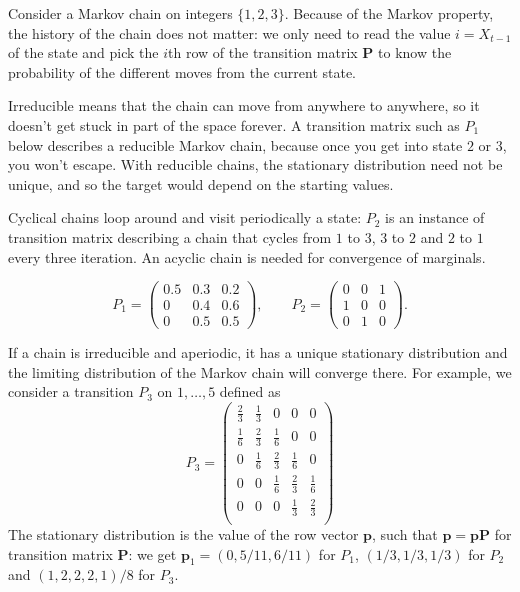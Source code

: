 \documentclass[
  11pt,
  letterpaper,
]{scrbook}
\theoremstyle{definition}
\theoremstyle{definition}
\theoremstyle{definition}
\theoremstyle{plain}
\theoremstyle{plain}
\theoremstyle{remark}
\begin{document}
Consider a Markov chain on integers \(\{1, 2, 3\}\). Because of the
Markov property, the history of the chain does not matter: we only need
to read the value \(i=X_{t-1}\) of the state and pick the \(i\)th row of
the transition matrix \(\mathbf{P}\) to know the probability of the
different moves from the current state.

Irreducible means that the chain can move from anywhere to anywhere, so
it doesn't get stuck in part of the space forever. A transition matrix
such as \(P_1\) below describes a reducible Markov chain, because once
you get into state \(2\) or \(3\), you won't escape. With reducible
chains, the stationary distribution need not be unique, and so the
target would depend on the starting values.

Cyclical chains loop around and visit periodically a state: \(P_2\) is
an instance of transition matrix describing a chain that cycles from
\(1\) to \(3\), \(3\) to \(2\) and \(2\) to \(1\) every three iteration.
An acyclic chain is needed for convergence of marginals.

\[
P_1 = \begin{pmatrix}
0.5 & 0.3 & 0.2 \\
0 & 0.4 & 0.6 \\
0 & 0.5 & 0.5
\end{pmatrix},
\qquad
P_2 = \begin{pmatrix}
0 & 0 & 1 \\
1 & 0 & 0 \\
0 & 1 & 0
\end{pmatrix}.
\]

If a chain is irreducible and aperiodic, it has a unique stationary
distribution and the limiting distribution of the Markov chain will
converge there. For example, we consider a transition \(P_3\) on
\(1, \ldots, 5\) defined as \[
P_3 = \begin{pmatrix}
\frac{2}{3} & \frac{1}{3} &  0 & 0 & 0 \\
\frac{1}{6} & \frac{2}{3} & \frac{1}{6} & 0 & 0 \\
0 & \frac{1}{6} & \frac{2}{3} & \frac{1}{6} & 0 \\
0 & 0 & \frac{1}{6} & \frac{2}{3} & \frac{1}{6} \\
0 & 0 & 0 &  \frac{1}{3}  & \frac{2}{3} \\
\end{pmatrix}
\] The stationary distribution is the value of the row vector
\(\boldsymbol{p}\), such that
\(\boldsymbol{p} = \boldsymbol{p}\mathbf{P}\) for transition matrix
\(\mathbf{P}\): we get \(\boldsymbol{p}_1=(0, 5/11, 6/11)\) for \(P_1\),
\((1/3, 1/3, 1/3)\) for \(P_2\) and \((1,2,2,2,1)/8\) for \(P_3\).
\end{document}
